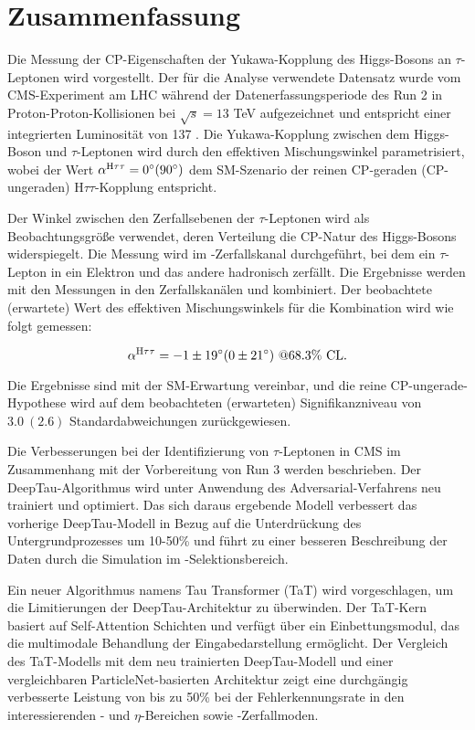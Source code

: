 \thispagestyle{empty}
\vspace{-3cm}
\section*{\centering Zusammenfassung}
\noindent

Die Messung der CP-Eigenschaften der Yukawa-Kopplung des Higgs-Bosons an $\tau$-Leptonen wird vorgestellt. Der f\"ur die Analyse verwendete Datensatz wurde vom CMS-Experiment am LHC w\"ahrend der Datenerfassungsperiode des Run 2 in Proton-Proton-Kollisionen bei $\sqrt{s}=13$ TeV aufgezeichnet und entspricht einer integrierten Luminosit\"at von 137 \ifb. Die Yukawa-Kopplung zwischen dem Higgs-Boson und $\tau$-Leptonen wird durch den effektiven Mischungswinkel \mixa parametrisiert, wobei der Wert $\alpha^{\text{H}\tau\tau} = 0^\circ (90^\circ)$ dem SM-Szenario der reinen CP-geraden (CP-ungeraden) $\text{H}\tau\tau$-Kopplung entspricht. 

Der Winkel zwischen den Zerfallsebenen der $\tau$-Leptonen wird als Beobachtungsgr\"o{\ss}e verwendet, deren Verteilung die CP-Natur des Higgs-Bosons widerspiegelt. Die Messung wird im \et-Zerfallskanal durchgef\"uhrt, bei dem ein $\tau$-Lepton in ein Elektron und das andere hadronisch zerf\"allt. Die Ergebnisse werden mit den Messungen in den Zerfallskan\"alen \mt und \tata kombiniert. Der beobachtete (erwartete) Wert des effektiven Mischungswinkels f\"ur die Kombination wird wie folgt gemessen:

\begin{equation*}
    \alpha^{\text{H}\tau\tau} = -1 \pm 19^\circ (0 \pm 21^\circ) ~@68.3\% \text{ CL}.
\end{equation*}

Die Ergebnisse sind mit der SM-Erwartung vereinbar, und die reine CP-ungerade-Hypothese wird auf dem beobachteten (erwarteten) Signifikanzniveau von $3.0 ~(2.6)$ Standardabweichungen zur\"uckgewiesen.

Die Verbesserungen bei der Identifizierung von $\tau$-Leptonen in CMS im Zusammenhang mit der Vorbereitung von Run 3 werden beschrieben. Der DeepTau-Algorithmus wird unter Anwendung des Adversarial-Verfahrens neu trainiert und optimiert. Das sich daraus ergebende Modell verbessert das vorherige DeepTau-Modell in Bezug auf die Unterdr\"uckung des Untergrundprozesses um 10-50\% und f\"uhrt zu einer besseren Beschreibung der Daten durch die Simulation im \htt-Selektionsbereich. 

Ein neuer Algorithmus namens Tau Transformer (TaT) wird vorgeschlagen, um die Limitierungen der DeepTau-Architektur zu \"uberwinden. Der TaT-Kern basiert auf Self-Attention Schichten und verf\"ugt \"uber ein Einbettungsmodul, das die multimodale Behandlung der Eingabedarstellung erm\"oglicht. Der Vergleich des TaT-Modells mit dem neu trainierten DeepTau-Modell und einer vergleichbaren ParticleNet-basierten Architektur zeigt eine durchg\"angig verbesserte Leistung von bis zu 50\% bei der Fehlerkennungsrate in den interessierenden \pt- und $\eta$-Bereichen sowie \tauh-Zerfallmoden.   

